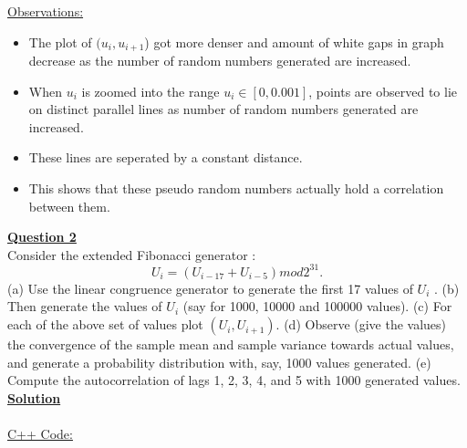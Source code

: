 \documentclass[11pt]{article}
\begin{document}
\newpage
\underline{Observations:}
\begin{itemize}
\item The plot of $(u_i,u_{i+1}$) got more denser and amount of white gaps in graph decrease as the number of random numbers generated are increased.
\item When $u_i$ is zoomed into the range $u_i \in [0,0.001]$, points are observed to lie on distinct parallel lines as number of random numbers generated are increased.
\item These lines are seperated by a constant distance.
\item This shows that these pseudo random numbers actually hold a correlation between them.
\end{itemize}
\newpage
\Large\textbf{{\underline{Question 2}}}\\
Consider the extended Fibonacci generator :\\
$$U_i = (U_{i-17} + U_{i-5} ) mod 2^{31}.$$
(a) Use the linear congruence generator to generate the first 17 values of $U_i$ . (b) Then generate the values of $U_i$ (say for 1000, 10000 and 100000 values). (c) For each of the above set of values plot $(U_i , U_{i+1} )$. (d) Observe (give the values) the convergence of the sample mean and sample variance towards actual values, and generate a probability distribution with, say, 1000 values generated. (e) Compute the autocorrelation of lags 1, 2, 3, 4, and 5 with 1000 generated values.\\
\Large\textbf{{\underline{Solution}}}\\\\
\underline{C++ Code:}
\end{document}
